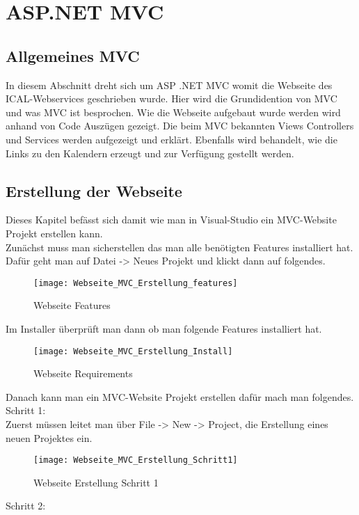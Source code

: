 {\chapter{ASP.NET MVC}
\label{sec:MVC}
\section{Allgemeines MVC}
\label{sec:allgemein}
In diesem Abschnitt dreht sich um ASP .NET MVC womit die Webseite des ICAL-Webservices geschrieben wurde. Hier wird die Grundidention von MVC und was MVC ist besprochen. Wie die Webseite aufgebaut wurde werden wird anhand von Code Auszügen gezeigt. Die beim MVC bekannten Views Controllers und Services werden aufgezeigt und erklärt. Ebenfalls wird behandelt, wie die Links zu den Kalendern erzeugt und zur Verfügung gestellt werden. 
\section{Erstellung der Webseite}
\label{sec:erstellung_ws}
Dieses Kapitel befässt sich damit wie man in Visual-Studio ein MVC-Website Projekt erstellen kann.\\
Zunächst muss man sicherstellen das man alle benötigten Features installiert hat. Dafür geht man auf Datei -> Neues Projekt und klickt dann auf folgendes.\\
\begin{figure}[H]
    \texttt{[image: Webseite\_MVC\_Erstellung\_features]}
    \caption{Webseite Features}
    \label{fig:webfeatures}
\end{figure}
Im Installer überprüft man dann ob man folgende Features installiert hat.\\
\begin{figure}[H]
    \texttt{[image: Webseite\_MVC\_Erstellung\_Install]}
    \caption{Webseite Requirements}
    \label{fig:webinstall}
\end{figure}
Danach kann man ein MVC-Website Projekt erstellen dafür mach man folgendes.\\
Schritt 1:\\
Zuerst müssen leitet man über File -> New -> Project, die Erstellung eines neuen Projektes ein.\\
\begin{figure}[H]
    \texttt{[image: Webseite\_MVC\_Erstellung\_Schritt1]}
    \caption{Webseite Erstellung Schritt 1}
    \label{fig:weberstell1}
\end{figure}
Schritt 2:\\
}
